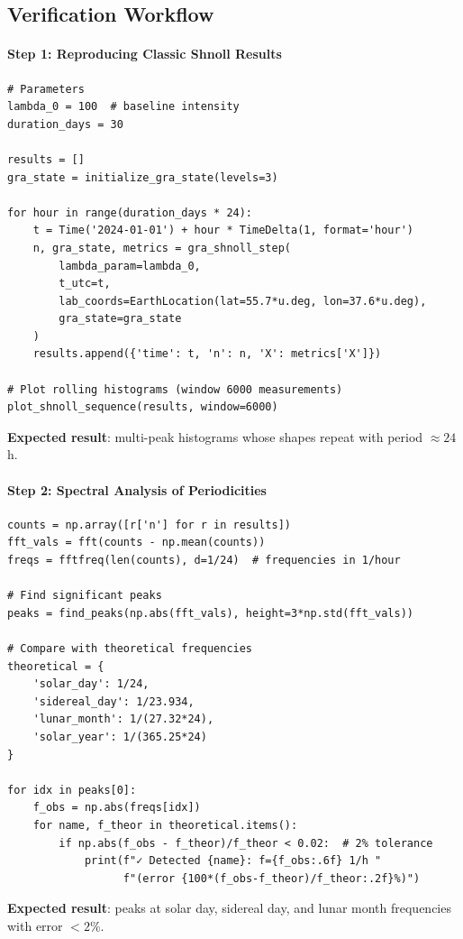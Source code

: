 \documentclass[12pt,a4paper]{article}
\theoremstyle{plain}
\theoremstyle{definition}
\theoremstyle{remark}
\begin{document}
\subsection{Verification Workflow}

\paragraph{Step 1: Reproducing Classic Shnoll Results}
\begin{lstlisting}[caption={30-day experiment simulation}, label={lst:reproduce-shnoll}]
# Parameters
lambda_0 = 100  # baseline intensity
duration_days = 30

results = []
gra_state = initialize_gra_state(levels=3)

for hour in range(duration_days * 24):
    t = Time('2024-01-01') + hour * TimeDelta(1, format='hour')
    n, gra_state, metrics = gra_shnoll_step(
        lambda_param=lambda_0,
        t_utc=t,
        lab_coords=EarthLocation(lat=55.7*u.deg, lon=37.6*u.deg),
        gra_state=gra_state
    )
    results.append({'time': t, 'n': n, 'X': metrics['X']})

# Plot rolling histograms (window 6000 measurements)
plot_shnoll_sequence(results, window=6000)
\end{lstlisting}
\textbf{Expected result}: multi-peak histograms whose shapes repeat with period $\approx 24$\,h.

\paragraph{Step 2: Spectral Analysis of Periodicities}
\begin{lstlisting}[caption={Detecting cosmophysical frequencies via FFT}, label={lst:fft-analysis}]
counts = np.array([r['n'] for r in results])
fft_vals = fft(counts - np.mean(counts))
freqs = fftfreq(len(counts), d=1/24)  # frequencies in 1/hour

# Find significant peaks
peaks = find_peaks(np.abs(fft_vals), height=3*np.std(fft_vals))

# Compare with theoretical frequencies
theoretical = {
    'solar_day': 1/24,
    'sidereal_day': 1/23.934,
    'lunar_month': 1/(27.32*24),
    'solar_year': 1/(365.25*24)
}

for idx in peaks[0]:
    f_obs = np.abs(freqs[idx])
    for name, f_theor in theoretical.items():
        if np.abs(f_obs - f_theor)/f_theor < 0.02:  # 2% tolerance
            print(f"✓ Detected {name}: f={f_obs:.6f} 1/h "
                  f"(error {100*(f_obs-f_theor)/f_theor:.2f}%)")
\end{lstlisting}
\textbf{Expected result}: peaks at solar day, sidereal day, and lunar month frequencies with error $<2\%$.
\end{document}
